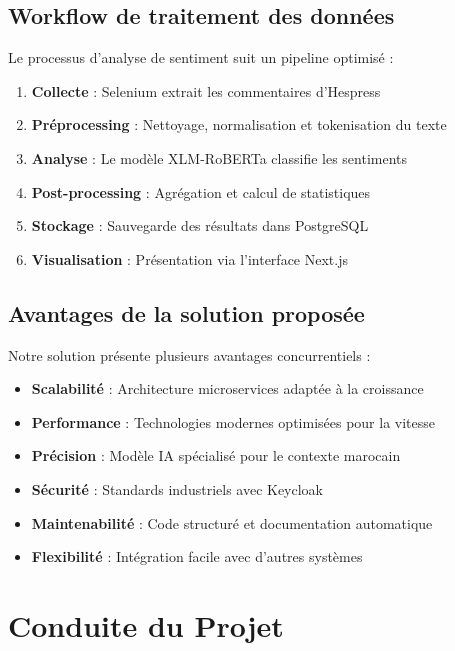 \subsection{Workflow de traitement des données}

Le processus d'analyse de sentiment suit un pipeline optimisé :

\begin{enumerate}
    \item \textbf{Collecte} : Selenium extrait les commentaires d'Hespress
    \item \textbf{Préprocessing} : Nettoyage, normalisation et tokenisation du texte
    \item \textbf{Analyse} : Le modèle XLM-RoBERTa classifie les sentiments
    \item \textbf{Post-processing} : Agrégation et calcul de statistiques
    \item \textbf{Stockage} : Sauvegarde des résultats dans PostgreSQL
    \item \textbf{Visualisation} : Présentation via l'interface Next.js
\end{enumerate}

\subsection{Avantages de la solution proposée}

Notre solution présente plusieurs avantages concurrentiels :

\begin{itemize}
    \item \textbf{Scalabilité} : Architecture microservices adaptée à la croissance
    \item \textbf{Performance} : Technologies modernes optimisées pour la vitesse
    \item \textbf{Précision} : Modèle IA spécialisé pour le contexte marocain
    \item \textbf{Sécurité} : Standards industriels avec Keycloak
    \item \textbf{Maintenabilité} : Code structuré et documentation automatique
    \item \textbf{Flexibilité} : Intégration facile avec d'autres systèmes
\end{itemize}

\section{Conduite du Projet}

